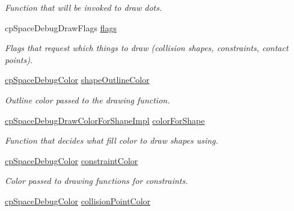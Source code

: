 \begin{DoxyCompactItemize}
\begin{DoxyCompactList}\small\item\em Function that will be invoked to draw dots. \end{DoxyCompactList}\item 
\hypertarget{structcp_space_debug_draw_options_a1b4b5128c4b70e3642f49ad71d49159f}{}cp\+Space\+Debug\+Draw\+Flags \hyperlink{structcp_space_debug_draw_options_a1b4b5128c4b70e3642f49ad71d49159f}{flags}\label{structcp_space_debug_draw_options_a1b4b5128c4b70e3642f49ad71d49159f}

\begin{DoxyCompactList}\small\item\em Flags that request which things to draw (collision shapes, constraints, contact points). \end{DoxyCompactList}\item 
\hypertarget{structcp_space_debug_draw_options_a5bc64c5754df1f4bc4b7a789e81555f8}{}\hyperlink{structcp_space_debug_color}{cp\+Space\+Debug\+Color} \hyperlink{structcp_space_debug_draw_options_a5bc64c5754df1f4bc4b7a789e81555f8}{shape\+Outline\+Color}\label{structcp_space_debug_draw_options_a5bc64c5754df1f4bc4b7a789e81555f8}

\begin{DoxyCompactList}\small\item\em Outline color passed to the drawing function. \end{DoxyCompactList}\item 
\hypertarget{structcp_space_debug_draw_options_a6de88f91bd66ef2f49ca32c3fb6ee145}{}\hyperlink{group__cp_space_gaba1fec950f2b58c7c72ab5ca553bdf43}{cp\+Space\+Debug\+Draw\+Color\+For\+Shape\+Impl} \hyperlink{structcp_space_debug_draw_options_a6de88f91bd66ef2f49ca32c3fb6ee145}{color\+For\+Shape}\label{structcp_space_debug_draw_options_a6de88f91bd66ef2f49ca32c3fb6ee145}

\begin{DoxyCompactList}\small\item\em Function that decides what fill color to draw shapes using. \end{DoxyCompactList}\item 
\hypertarget{structcp_space_debug_draw_options_a62271599c7cb15d39f6a2b4620173322}{}\hyperlink{structcp_space_debug_color}{cp\+Space\+Debug\+Color} \hyperlink{structcp_space_debug_draw_options_a62271599c7cb15d39f6a2b4620173322}{constraint\+Color}\label{structcp_space_debug_draw_options_a62271599c7cb15d39f6a2b4620173322}

\begin{DoxyCompactList}\small\item\em Color passed to drawing functions for constraints. \end{DoxyCompactList}\item 
\hypertarget{structcp_space_debug_draw_options_aaa3ebd801675e71f6ce0954514d3e9aa}{}\hyperlink{structcp_space_debug_color}{cp\+Space\+Debug\+Color} \hyperlink{structcp_space_debug_draw_options_aaa3ebd801675e71f6ce0954514d3e9aa}{collision\+Point\+Color}\label{structcp_space_debug_draw_options_aaa3ebd801675e71f6ce0954514d3e9aa}


\end{DoxyCompactItemize}
